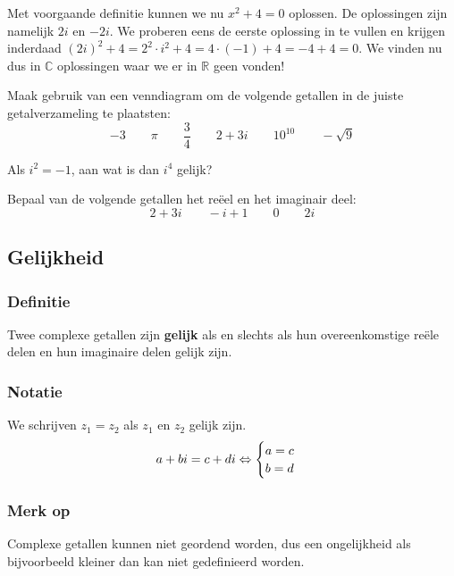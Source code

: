 \documentclass[12pt,twoside,a4paper]{article}
\begin{document}
Met voorgaande definitie kunnen we nu $x^2+4=0$ oplossen. De oplossingen zijn namelijk $2i$ en $-2i$. We proberen eens de eerste oplossing in te vullen en krijgen inderdaad $(2i)^2+4 = 2^2\cdot i^2 + 4 = 4\cdot(-1) + 4 = -4 + 4 = 0$. We vinden nu dus in $\mathbb{C}$ oplossingen waar we er in $\mathbb{R}$ geen vonden!

\begin{oefening}
  Maak gebruik van een venndiagram om de volgende getallen in de juiste getalverzameling te plaatsten:
  $$-3\qquad\pi\qquad\dfrac{3}{4}\qquad2+3i\qquad10^{10}\qquad-\sqrt{9}$$
\end{oefening}

\begin{oefening}
  Als $i^2=-1$, aan wat is dan $i^4$ gelijk?
\end{oefening}

\begin{oefening}
  Bepaal van de volgende getallen het reëel en het imaginair deel:
  $$2+3i\qquad -i+1\qquad 0 \qquad 2i$$
\end{oefening}

\subsection{Gelijkheid}

\subsubsection*{Definitie}
\begin{mdframed}
Twee complexe getallen zijn {\bf gelijk} als en slechts als hun overeenkomstige reële delen en hun imaginaire delen gelijk zijn.
\end{mdframed}

\subsubsection*{Notatie}
We schrijven $z_1=z_2$ als $z_1$ en $z_2$ gelijk zijn.
$$a+bi = c+di \Leftrightarrow \begin{cases}a=c \\ b=d\end{cases}$$

\subsubsection*{Merk op}
Complexe getallen kunnen niet geordend worden, dus een ongelijkheid als bijvoorbeeld kleiner dan kan niet gedefinieerd worden.
\end{document}
